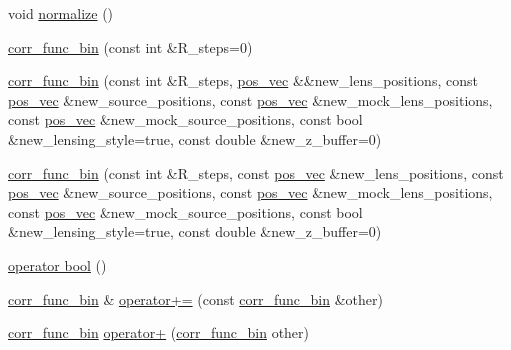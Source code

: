 \begin{DoxyCompactItemize}
\item 
void \hyperlink{structcorr__func__bin_a4d7626836ca9329d179520ca72d6af0d}{normalize} ()
\item 
\hyperlink{structcorr__func__bin_a32ec71e0d9ae366bc3b103260e662567}{corr\-\_\-func\-\_\-bin} (const int \&R\-\_\-steps=0)
\item 
\hyperlink{structcorr__func__bin_adc153b1daa54da93bdb3a47c8d1873ea}{corr\-\_\-func\-\_\-bin} (const int \&R\-\_\-steps, \hyperlink{structcorr__func__bin_a683c7075740b3dcae9ebb1ac758c0bfa}{pos\-\_\-vec} \&\&new\-\_\-lens\-\_\-positions, const \hyperlink{structcorr__func__bin_a683c7075740b3dcae9ebb1ac758c0bfa}{pos\-\_\-vec} \&new\-\_\-source\-\_\-positions, const \hyperlink{structcorr__func__bin_a683c7075740b3dcae9ebb1ac758c0bfa}{pos\-\_\-vec} \&new\-\_\-mock\-\_\-lens\-\_\-positions, const \hyperlink{structcorr__func__bin_a683c7075740b3dcae9ebb1ac758c0bfa}{pos\-\_\-vec} \&new\-\_\-mock\-\_\-source\-\_\-positions, const bool \&new\-\_\-lensing\-\_\-style=true, const double \&new\-\_\-z\-\_\-buffer=0)
\item 
\hyperlink{structcorr__func__bin_ac4625f1ff7e13e360836611e64a8f22a}{corr\-\_\-func\-\_\-bin} (const int \&R\-\_\-steps, const \hyperlink{structcorr__func__bin_a683c7075740b3dcae9ebb1ac758c0bfa}{pos\-\_\-vec} \&new\-\_\-lens\-\_\-positions, const \hyperlink{structcorr__func__bin_a683c7075740b3dcae9ebb1ac758c0bfa}{pos\-\_\-vec} \&new\-\_\-source\-\_\-positions, const \hyperlink{structcorr__func__bin_a683c7075740b3dcae9ebb1ac758c0bfa}{pos\-\_\-vec} \&new\-\_\-mock\-\_\-lens\-\_\-positions, const \hyperlink{structcorr__func__bin_a683c7075740b3dcae9ebb1ac758c0bfa}{pos\-\_\-vec} \&new\-\_\-mock\-\_\-source\-\_\-positions, const bool \&new\-\_\-lensing\-\_\-style=true, const double \&new\-\_\-z\-\_\-buffer=0)
\item 
\hyperlink{structcorr__func__bin_abe404510805b11498212bd1268daa2ed}{operator bool} ()
\item 
\hyperlink{structcorr__func__bin}{corr\-\_\-func\-\_\-bin} \& \hyperlink{structcorr__func__bin_a9f617c1efaa70492e2abffcf940b6353}{operator+=} (const \hyperlink{structcorr__func__bin}{corr\-\_\-func\-\_\-bin} \&other)
\item 
\hyperlink{structcorr__func__bin}{corr\-\_\-func\-\_\-bin} \hyperlink{structcorr__func__bin_a6684a7372d074c139864d2c0891f769e}{operator+} (\hyperlink{structcorr__func__bin}{corr\-\_\-func\-\_\-bin} other)
\end{DoxyCompactItemize}
